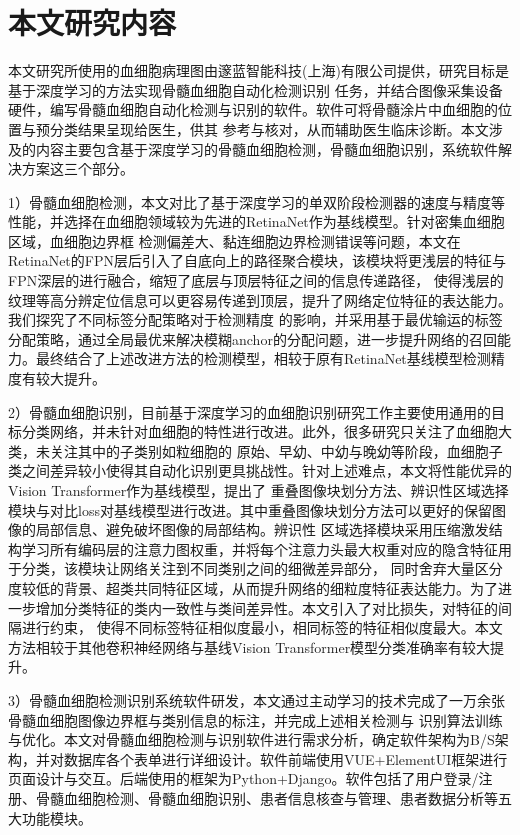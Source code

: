 \section{本文研究内容}
本文研究所使用的血细胞病理图由邃蓝智能科技(上海)有限公司提供，研究目标是基于深度学习的方法实现骨髓血细胞自动化检测识别
任务，并结合图像采集设备硬件，编写骨髓血细胞自动化检测与识别的软件。软件可将骨髓涂片中血细胞的位置与预分类结果呈现给医生，供其
参考与核对，从而辅助医生临床诊断。本文涉及的内容主要包含基于深度学习的骨髓血细胞检测，骨髓血细胞识别，系统软件解决方案这三个部分。

1）骨髓血细胞检测，本文对比了基于深度学习的单双阶段检测器的速度与精度等性能，并选择在血细胞领域较为先进的RetinaNet作为基线模型。针对密集血细胞区域，血细胞边界框
检测偏差大、黏连细胞边界检测错误等问题，本文在RetinaNet的FPN层后引入了自底向上的路径聚合模块，该模块将更浅层的特征与FPN深层的进行融合，缩短了底层与顶层特征之间的信息传递路径，
使得浅层的纹理等高分辨定位信息可以更容易传递到顶层，提升了网络定位特征的表达能力。我们探究了不同标签分配策略对于检测精度
的影响，并采用基于最优输运的标签分配策略，通过全局最优来解决模糊anchor的分配问题，进一步提升网络的召回能力。最终结合了上述改进方法的检测模型，相较于原有RetinaNet基线模型检测精度有较大提升。

2）骨髓血细胞识别，目前基于深度学习的血细胞识别研究工作主要使用通用的目标分类网络，并未针对血细胞的特性进行改进。此外，很多研究只关注了血细胞大类，未关注其中的子类别如粒细胞的
原始、早幼、中幼与晚幼等阶段，血细胞子类之间差异较小使得其自动化识别更具挑战性。针对上述难点，本文将性能优异的Vision Transformer作为基线模型，提出了
重叠图像块划分方法、辨识性区域选择模块与对比loss对基线模型进行改进。其中重叠图像块划分方法可以更好的保留图像的局部信息、避免破坏图像的局部结构。辨识性
区域选择模块采用压缩激发结构学习所有编码层的注意力图权重，并将每个注意力头最大权重对应的隐含特征用于分类，该模块让网络关注到不同类别之间的细微差异部分，
同时舍弃大量区分度较低的背景、超类共同特征区域，从而提升网络的细粒度特征表达能力。为了进一步增加分类特征的类内一致性与类间差异性。本文引入了对比损失，对特征的间隔进行约束，
使得不同标签特征相似度最小，相同标签的特征相似度最大。本文方法相较于其他卷积神经网络与基线Vision Transformer模型分类准确率有较大提升。

3）骨髓血细胞检测识别系统软件研发，本文通过主动学习的技术完成了一万余张骨髓血细胞图像边界框与类别信息的标注，并完成上述相关检测与
识别算法训练与优化。本文对骨髓血细胞检测与识别软件进行需求分析，确定软件架构为B/S架构，并对数据库各个表单进行详细设计。软件前端使用VUE+ElementUI框架进行
页面设计与交互。后端使用的框架为Python+Django。软件包括了用户登录/注册、骨髓血细胞检测、骨髓血细胞识别、患者信息核查与管理、患者数据分析等五大功能模块。

